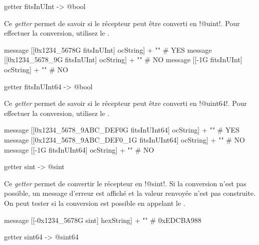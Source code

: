 
\begin{galgas3box}
getter fitsInUInt -> @bool
\end{galgas3box}

Ce \emph{getter} permet de savoir si le récepteur peut être converti en \ggst!@uint!. Pour effectuer la conversion, utilisez le .

\begin{galgas3}
message [[0x1234_5678G fitsInUInt] ocString] + "\n" # YES
message [[0x1234_5678_9G fitsInUInt] ocString] + "\n" # NO
message [[-1G fitsInUInt] ocString] + "\n" # NO
\end{galgas3}







\begin{galgas3box}
getter fitsInUInt64 -> @bool
\end{galgas3box}

Ce \emph{getter} permet de savoir si le récepteur peut être converti en \ggst!@uint64!. Pour effectuer la conversion, utilisez le .

\begin{galgas3}
message [[0x1234_5678_9ABC_DEF0G fitsInUInt64] ocString] + "\n" # YES
message [[0x1234_5678_9ABC_DEF0_1G fitsInUInt64] ocString] + "\n" # NO
message [[-1G fitsInUInt64] ocString] + "\n" # NO
\end{galgas3}



\begin{galgas3box}
getter sint -> @sint
\end{galgas3box}

Ce \emph{getter} permet de convertir le récepteur en \ggst!@sint!. Si la conversion n'est pas possible, un message d'erreur est affiché et la valeur renvoyée n'est pas construite. On peut tester si la conversion est possible en appelant le .

\begin{galgas3}
message [[-0x1234_5678G sint] hexString] + "\n" # 0xEDCBA988
\end{galgas3}





\begin{galgas3box}
getter sint64 -> @sint64
\end{galgas3box}

